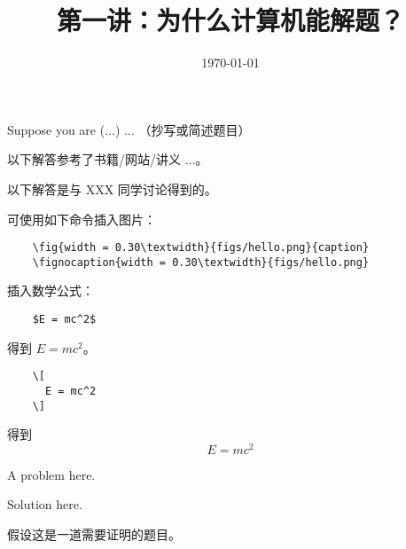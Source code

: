 \documentclass[11pt, a4paper, UTF8]{ctexart}
\title{第一讲：为什么计算机能解题？}
\date{\today}     %
\begin{document}
\maketitle
\noplagiarism	%
\beginrequired	%

\begin{problem}[UD: 1.5]	%
  Suppose you are ($\ldots$) $\ldots$ （抄写或简述题目）
\end{problem}

\begin{remark}	%
  以下解答参考了书籍/网站/讲义 $\ldots$。

  \noindent 以下解答是与 XXX 同学讨论得到的。
\end{remark}

\begin{solution}
  可使用如下命令插入图片：
  \begin{verbatim}
    \fig{width = 0.30\textwidth}{figs/hello.png}{caption}
    \fignocaption{width = 0.30\textwidth}{figs/hello.png}
  \end{verbatim}
  插入数学公式：
  \begin{verbatim}
    $E = mc^2$
  \end{verbatim}
  得到 $E = mc^2$。
  \begin{verbatim}
    \[
      E = mc^2
    \]
  \end{verbatim}
  得到
  \[
    E = mc^2
  \]
\end{solution}

\begin{problem}[UD: 1.3]
  A problem here.
\end{problem}

\begin{solution}
  Solution here.
\end{solution}


\beginoptional	%

\begin{problem}[UD: x.x]
  假设这是一道需要证明的题目。	
\end{problem}
\end{document}

